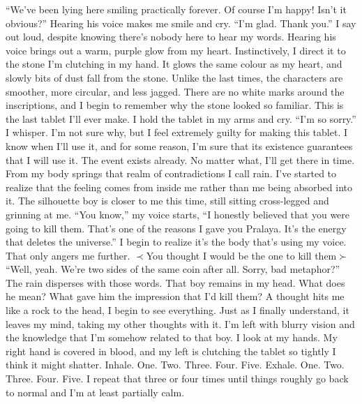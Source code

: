 \documentclass[openany, 12pt]{book}
\newcommand\tab[1][1cm]{\hspace*{#1}}
\newcommand\suck[1]{$\prec$#1$\succ$}
\begin{document}
\newline
\tab
``We’ve been lying here smiling practically forever. Of course I’m happy! Isn’t it obvious?'' Hearing his voice makes me smile and cry.
\newline
\tab
``I’m glad. Thank you.'' I say out loud, despite knowing there’s nobody here to hear my words. Hearing his voice brings out a warm, purple glow from my heart.  Instinctively, I direct it to the stone I’m clutching in my hand. It glows the same colour as my heart, and slowly bits of dust fall from the stone. Unlike the last times, the characters are smoother, more circular, and less jagged. There are no white marks around the inscriptions, and I begin to remember why the stone looked so familiar. This is the last tablet I’ll ever make.
\newline
\tab
I hold the tablet in my arms and cry. ``I’m so sorry.'' I whisper. I’m not sure why, but I feel extremely guilty for making this tablet. I know when I’ll use it, and for some reason, I’m sure that its existence guarantees that I will use it. The event exists already. No matter what, I’ll get there in time. 
\newline
\tab
From my body springs that realm of contradictions I call rain. I’ve started to realize that the feeling comes from inside me rather than me being absorbed into it. The silhouette boy is closer to me this time, still sitting cross-legged and grinning at me. ``You know,'' my voice starts, ``I honestly believed that you were going to kill them. That’s one of the reasons I gave you Pralaya. It’s the energy that deletes the universe.'' I begin to realize it’s the body that’s using my voice. That only angers me further.
\newline
\suck{You thought I would be the one to kill them\textinterrobang}
\newline
\tab
``Well, yeah. We’re two sides of the same coin after all. Sorry, bad metaphor?'' The rain disperses with those words. That boy remains in my head. What does he mean? What gave him the impression that I’d kill them? A thought hits me like a rock to the head, I begin to see everything. Just as I finally understand, it leaves my mind, taking my other thoughts with it. I’m left with blurry vision and the knowledge that I’m somehow related to that boy. I look at my hands. My right hand is covered in blood, and my left is clutching the tablet so tightly I think it might shatter. Inhale. One. Two. Three. Four. Five. Exhale. One. Two. Three. Four. Five. I repeat that three or four times until things roughly go back to normal and I’m at least partially calm.
\end{document}
